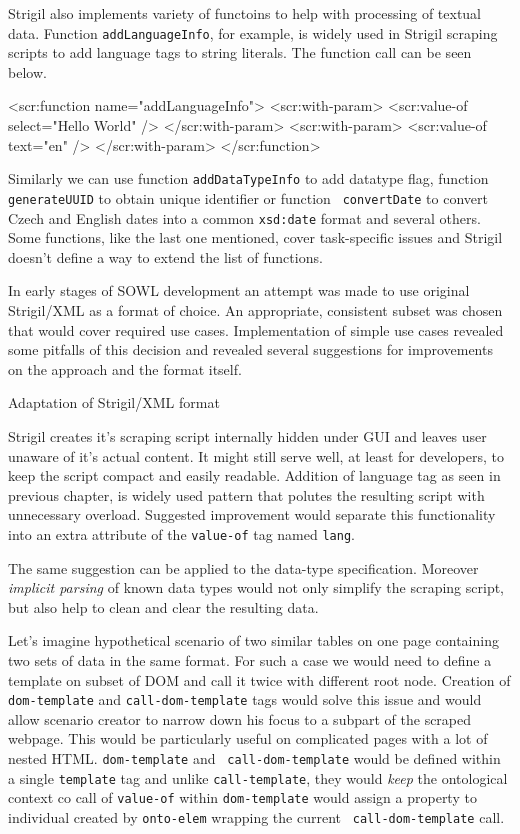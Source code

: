 Strigil also implements variety of functoins to help with processing of textual
data. Function {\tt addLanguageInfo}, for example, is widely used in Strigil
scraping scripts to add language tags to string literals. The function call can
be seen below. 

\begtt
<scr:function name="addLanguageInfo">
  <scr:with-param>
    <scr:value-of select="Hello World" />
  </scr:with-param>
  <scr:with-param>
    <scr:value-of text="en" />
  </scr:with-param>
</scr:function>
\endtt

Similarly we can use function {\tt addDataTypeInfo} to add datatype flag,
function {\tt generateUUID} to obtain unique identifier or function {\tt
convertDate} to convert Czech and English dates into a common {\tt xsd:date}
format and several others. Some functions, like the last one mentioned, cover
task-specific issues and Strigil doesn't define a way to extend the list of
functions. 

In early stages of SOWL development an attempt was made to use original
Strigil/XML as a format of choice. An appropriate, consistent subset was chosen
that would cover required use cases. Implementation of simple use cases
revealed some pitfalls of this decision and revealed several suggestions for
improvements on the approach and the format itself. 


\secc Adaptation of Strigil/XML format

Strigil creates it's scraping script internally hidden under GUI and leaves
user unaware of it's actual content. It might still serve well, at least for
developers, to keep the script compact and easily readable. Addition of
language tag as seen in previous chapter, is widely used pattern that polutes
the resulting script with unnecessary overload. Suggested improvement would
separate this functionality into an extra attribute of the {\tt value-of} tag
named {\tt lang}.

The same suggestion can be applied to the data-type specification. Moreover
{\em implicit parsing} of known data types would not only simplify the scraping
script, but also help to clean and clear the resulting data. 

Let's imagine hypothetical scenario of two similar tables on one page
containing two sets of data in the same format. For such a case we would need
to define a template on subset of DOM and call it twice with different root
node. Creation of {\tt dom-template} and {\tt call-dom-template} tags would
solve this issue and would allow scenario creator to narrow down his focus to a
subpart of the scraped webpage. This would be particularly useful on
complicated pages with a lot of nested HTML. {\tt dom-template} and {\tt
call-dom-template} would be defined within a single {\tt template} tag and
unlike {\tt call-template}, they would {\em keep} the ontological context co
call of {\tt value-of} within {\tt dom-template} would assign a property to
individual created by {\tt onto-elem} wrapping the current {\tt
call-dom-template} call. 

